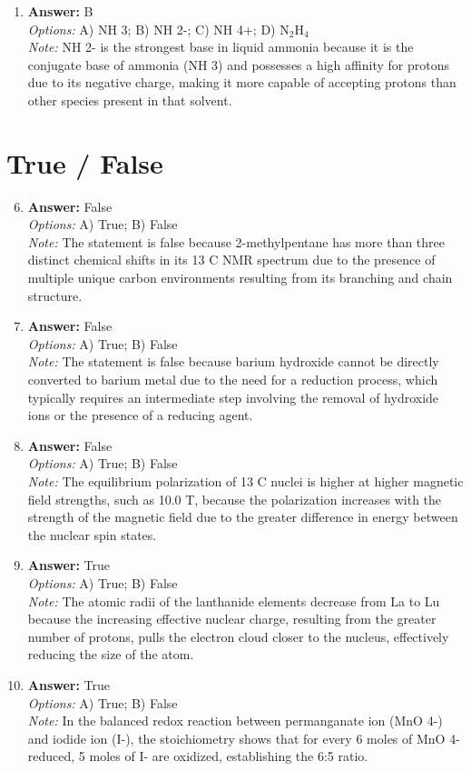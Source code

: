 \documentclass[12pt]{article}
\begin{document}
\begin{enumerate}[label=\arabic*.]
\item \textbf{Answer:} B
\\ \textit{Options:} A) NH 3; B) NH 2-; C) NH 4+; D) N$_{2}$H$_{4}$
\\ \textit{Note:} NH 2- is the strongest base in liquid ammonia because it is the conjugate base of ammonia (NH 3) and possesses a high affinity for protons due to its negative charge, making it more capable of accepting protons than other species present in that solvent.
\end{enumerate}

\section*{True / False}
\begin{enumerate}[label=\arabic*.]
\setcounter{enumi}{5}
\item \textbf{Answer:} False
\\ \textit{Options:} A) True; B) False
\\ \textit{Note:} The statement is false because 2-methylpentane has more than three distinct chemical shifts in its 13 C NMR spectrum due to the presence of multiple unique carbon environments resulting from its branching and chain structure.
\item \textbf{Answer:} False
\\ \textit{Options:} A) True; B) False
\\ \textit{Note:} The statement is false because barium hydroxide cannot be directly converted to barium metal due to the need for a reduction process, which typically requires an intermediate step involving the removal of hydroxide ions or the presence of a reducing agent.
\item \textbf{Answer:} False
\\ \textit{Options:} A) True; B) False
\\ \textit{Note:} The equilibrium polarization of 13 C nuclei is higher at higher magnetic field strengths, such as 10.0 T, because the polarization increases with the strength of the magnetic field due to the greater difference in energy between the nuclear spin states.
\item \textbf{Answer:} True
\\ \textit{Options:} A) True; B) False
\\ \textit{Note:} The atomic radii of the lanthanide elements decrease from La to Lu because the increasing effective nuclear charge, resulting from the greater number of protons, pulls the electron cloud closer to the nucleus, effectively reducing the size of the atom.
\item \textbf{Answer:} True
\\ \textit{Options:} A) True; B) False
\\ \textit{Note:} In the balanced redox reaction between permanganate ion (MnO 4-) and iodide ion (I-), the stoichiometry shows that for every 6 moles of MnO 4- reduced, 5 moles of I- are oxidized, establishing the 6:5 ratio.
\end{enumerate}
\end{document}

